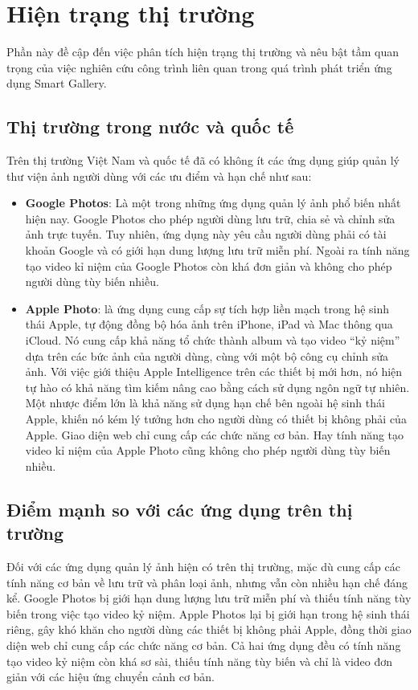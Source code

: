 \section{Hiện trạng thị trường} 
Phần này đề cập đến việc phân tích hiện trạng thị trường và nêu bật tầm quan trọng của việc nghiên cứu công trình liên quan trong quá trình phát triển ứng dụng Smart Gallery.
\subsection{Thị trường trong nước và quốc tế}
Trên thị trường Việt Nam và quốc tế đã có không ít các ứng dụng giúp quản lý thư viện ảnh người dùng với các ưu điểm và hạn chế như sau:
\begin{itemize}
    \item \textbf{Google Photos}: Là một trong những ứng dụng quản lý ảnh phổ biến nhất hiện nay. Google Photos cho phép người dùng lưu trữ, chia sẻ và chỉnh sửa ảnh trực tuyến. Tuy nhiên, ứng dụng này yêu cầu người dùng phải có tài khoản Google và có giới hạn dung lượng lưu trữ miễn phí. Ngoài ra tính năng tạo video kỉ niệm của Google Photos còn khá đơn giản và không cho phép người dùng tùy biến nhiều.
    \item \textbf{Apple Photo}: là ứng dụng cung cấp sự tích hợp liền mạch trong hệ sinh thái Apple, tự động đồng bộ hóa ảnh trên iPhone, iPad và Mac thông qua iCloud. Nó cung cấp khả năng tổ chức thành album và tạo video ``kỷ niệm'' dựa trên các bức ảnh của người dùng, cùng với một bộ công cụ chỉnh sửa ảnh. Với việc giới thiệu Apple Intelligence trên các thiết bị mới hơn, nó hiện tự hào có khả năng tìm kiếm nâng cao bằng cách sử dụng ngôn ngữ tự nhiên. Một nhược điểm lớn là khả năng sử dụng hạn chế bên ngoài hệ sinh thái Apple, khiến nó kém lý tưởng hơn cho người dùng có thiết bị không phải của Apple. Giao diện web chỉ cung cấp các chức năng cơ bản. Hay tính năng tạo video kỉ niệm của Apple Photo cũng không cho phép người dùng tùy biến nhiều.
\end{itemize}

\subsection{Điểm mạnh so với các ứng dụng trên thị trường}
Đối với các ứng dụng quản lý ảnh hiện có trên thị trường, mặc dù cung cấp các tính năng cơ bản về lưu trữ và phân loại ảnh, nhưng vẫn còn nhiều hạn chế đáng kể. Google Photos bị giới hạn dung lượng lưu trữ miễn phí và thiếu tính năng tùy biến trong việc tạo video kỷ niệm. Apple Photos lại bị giới hạn trong hệ sinh thái riêng, gây khó khăn cho người dùng các thiết bị không phải Apple, đồng thời giao diện web chỉ cung cấp các chức năng cơ bản. Cả hai ứng dụng đều có tính năng tạo video kỷ niệm còn khá sơ sài, thiếu tính năng tùy biến và chỉ là video đơn giản với các hiệu ứng chuyển cảnh cơ bản.

